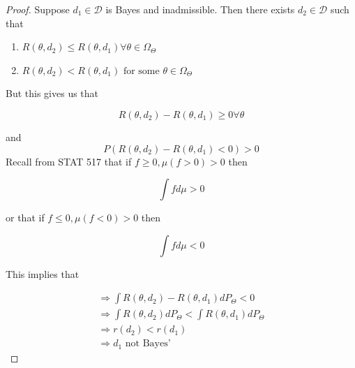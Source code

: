 \documentclass[11pt,fleqn]{book} %
\begin{document}
\begin{proof}
	Suppose $d_1 \in \mathcal{D}$ is Bayes and inadmissible. Then there exists $d_2 \in \mathcal{D}$ such that

		\begin{enumerate}
			\item $R(\theta, d_2) \leq R(\theta, d_1) \forall \theta \in \Omega_\Theta$
			\item  $R(\theta, d_2) < R(\theta, d_1) \text{ for some } \theta \in \Omega_\Theta$
		\end{enumerate}

But this gives us that 

		$$R(\theta, d_2) - R(\theta, d_1) \geq 0  \forall \theta$$

		and
			$$P(R(\theta, d_2) - R(\theta, d_1) < 0 ) > 0$$
Recall from STAT 517 that if $f \geq 0, \mu(f> 0) > 0$ then 
		
				$$\int f d\mu > 0 $$

	or that  if $f \leq 0, \mu(f< 0) > 0$ then

			$$\int f d\mu < 0  $$

	This implies that 

		\begin{align*}
			\Rightarrow \int R(\theta, d_2) - R(\theta, d_1) d P_\Theta < 0\\
			\Rightarrow \int R(\theta, d_2)d P_\Theta < \int R(\theta, d_1) d P_\Theta\\
			\Rightarrow r(d_2) < r(d_1)\\
			\Rightarrow d_1 \text{ not Bayes'}
			\end{align*}

\end{proof}















\end{document}
